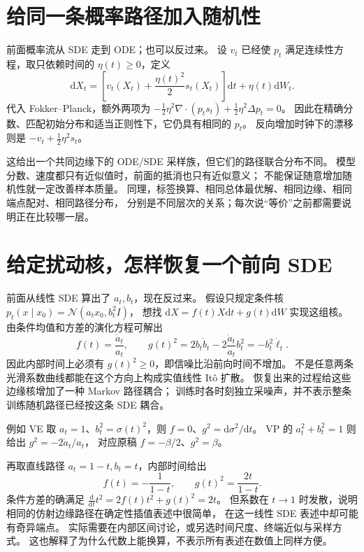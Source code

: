 \section{给同一条概率路径加入随机性}
前面概率流从 SDE 走到 ODE；也可以反过来。
设 $v_t$ 已经使 $p_t$ 满足连续性方程，取只依赖时间的 $\eta(t)\geq0$，定义
\[
\mathrm dX_t=\left[v_t(X_t)+\frac{\eta(t)^2}{2}s_t(X_t)\right]\mathrm dt
 +\eta(t)\mathrm dW_t.
\label{supp:same-marginal-family}
\]
代入 Fokker--Planck，额外两项为
$-\tfrac12\eta^2\nabla\cdot(p_ts_t)+\tfrac12\eta^2\Delta p_t=0$。
因此在精确分数、匹配初始分布和适当正则性下，它仍具有相同的 $p_t$。
反向增加时钟下的漂移则是 $-v_t+\tfrac12\eta^2s_t$。

这给出一个共同边缘下的 ODE/SDE 采样族，但它们的路径联合分布不同。
模型分数、速度都只有近似值时，前面的抵消也只有近似意义；
不能保证随意增加随机性就一定改善样本质量。
同理，标签换算、相同总体最优解、相同边缘、相同端点配对、相同路径分布，
分别是不同层次的关系；每次说“等价”之前都需要说明正在比较哪一层。\cite{theorybook}

\section{给定扰动核，怎样恢复一个前向 SDE}
前面从线性 SDE 算出了 $a_t,b_t$，现在反过来。
假设只规定条件核 $p_t(x\mid x_0)=\mathcal N(a_tx_0,b_t^2I)$，
想找 $\mathrm dX=f(t)X\mathrm dt+g(t)\mathrm dW$ 实现这组核。
由条件均值和方差的演化方程可解出
\[
f(t)=\frac{\dot a_t}{a_t},\qquad
g(t)^2=2b_t\dot b_t-2\frac{\dot a_t}{a_t}b_t^2
=-b_t^2\dot\ell_t.
\]
因此内部时间上必须有 $g(t)^2\geq0$，即信噪比沿前向时间不增加。
不是任意两条光滑系数曲线都能在这个方向上构成实值线性 Itô 扩散。
恢复出来的过程给这些边缘核增加了一种 Markov 路径耦合；
训练时各时刻独立采噪声，并不表示整条训练随机路径已经按这条 SDE 耦合。

例如 VE 取 $a_t=1$、$b_t^2=\sigma(t)^2$，则
$f=0$、$g^2=\mathrm d\sigma^2/\mathrm dt$。
VP 的 $a_t^2+b_t^2=1$ 则给出 $g^2=-2\dot a_t/a_t$，
对应原稿 $f=-\beta/2$、$g^2=\beta$。

再取直线路径 $a_t=1-t,b_t=t$，内部时间给出
\[
f(t)=-\frac1{1-t},\qquad g(t)^2=\frac{2t}{1-t}.
\]
条件方差的确满足
$\frac{\mathrm d}{\mathrm dt}t^2=2f(t)t^2+g(t)^2=2t$。
但系数在 $t\to1$ 时发散，说明相同的仿射边缘路径在确定性插值表述中很简单，
在这一线性 SDE 表述中却可能有奇异端点。
实际需要在内部区间讨论，或另选时间尺度、终端近似与采样方式。
这也解释了为什么代数上能换算，不表示所有表述在数值上同样方便。
